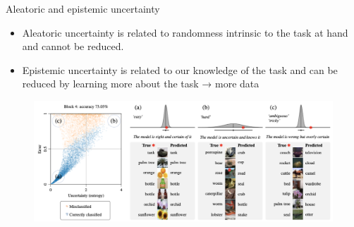 \begin{frame}{Aleatoric and epistemic uncertainty}
    \begin{itemize}
        \item Aleatoric uncertainty is related to randomness intrinsic to the task at hand and cannot be reduced.
        \item Epistemic uncertainty is related to our knowledge of the task and can be reduced by learning more about the task → more data
    \end{itemize}
    \begin{figure}
        \centering
        \includegraphics[width=0.7\linewidth]{Screenshot 2025-04-08 at 15.14.46.png}
        \label{fig:enter-label}
    \end{figure}

\end{frame}

